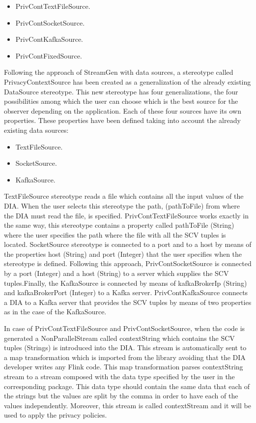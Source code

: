 \begin{itemize}
\item PrivContTextFileSource.
\item PrivContSocketSource.
\item PrivContKafkaSource.
\item PrivContFixedSource.
\end{itemize}

Following the approach of StreamGen with data sources, a stereotype called PrivacyContextSource has been created as a generalization of the already existing DataSource stereotype. This new stereotype has four generalizations, the four possibilities among which the user can choose which is the best source for the observer depending on the application. Each of these four sources have its own properties. These properties have been defined taking into account the already existing data sources:

\begin{itemize}
\item TextFileSource.
\item SocketSource.
\item KafkaSource.
\end{itemize}

TextFileSource stereotype reads a file which contains all the input values of the DIA. When the user selects this stereotype the path, (pathToFile) from where the DIA must read the file, is specified. PrivContTextFileSource works exactly in the same way, this stereotype contains a property called pathToFile (String) where the user specifies the path where the file with all the SCV tuples is located. SocketSource stereotype is connected to a port and to a host by means of the properties host (String) and port (Integer) that the user specifies when the stereotype is defined. Following this approach, PrivContSocketSource is connected by a port (Integer) and a host (String) to a server which supplies the SCV tuples.Finally, the KafkaSource is connected by means of kafkaBrokerIp (String) and kafkaBrokerPort (Integer) to a Kafka server. PrivContKafkaSource connects a DIA to a Kafka server that provides the SCV tuples by means of two properties as in the case of the KafkaSource.

In case of PrivContTextFileSource and PrivContSocketSource, when the code is generated a NonParallelStream called contextString which contains the SCV tuples (Strings) is introduced into the DIA. This stream is automatically sent to a map transformation which is imported from the library avoiding that the DIA developer writes any Flink code. This map transformation parses contextString stream to a stream composed with the data type specified by the user in the corresponding package. This data type should contain the same data that each of the strings but the values are split by the comma in order to have each of the values independently. Moreover, this stream is called contextStream and it will be used to apply the privacy policies.

